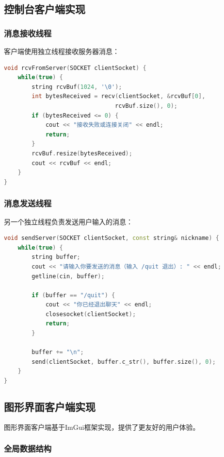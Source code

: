 \documentclass[12pt, a4paper]{article}
\begin{document}
\subsection{控制台客户端实现}

\subsubsection{消息接收线程}

客户端使用独立线程接收服务器消息：

\begin{lstlisting}[language=c++]
void rcvFromServer(SOCKET clientSocket) {
    while(true) {
        string rcvBuf(1024, '\0');
        int bytesReceived = recv(clientSocket, &rcvBuf[0], 
                                rcvBuf.size(), 0);
        if (bytesReceived <= 0) {
            cout << "接收失败或连接关闭" << endl;
            return;
        }
        rcvBuf.resize(bytesReceived);
        cout << rcvBuf << endl;
    }
}
\end{lstlisting}

\subsubsection{消息发送线程}

另一个独立线程负责发送用户输入的消息：

\begin{lstlisting}[language=c++]
void sendServer(SOCKET clientSocket, const string& nickname) {
    while(true) {
        string buffer;
        cout << "请输入你要发送的消息（输入 /quit 退出）: " << endl;
        getline(cin, buffer);
        
        if (buffer == "/quit") {
            cout << "你已经退出聊天" << endl;
            closesocket(clientSocket);
            return;
        }
        
        buffer += "\n";
        send(clientSocket, buffer.c_str(), buffer.size(), 0);
    }
}
\end{lstlisting}

\subsection{图形界面客户端实现}

图形界面客户端基于ImGui框架实现，提供了更友好的用户体验。

\subsubsection{全局数据结构}
\end{document}
